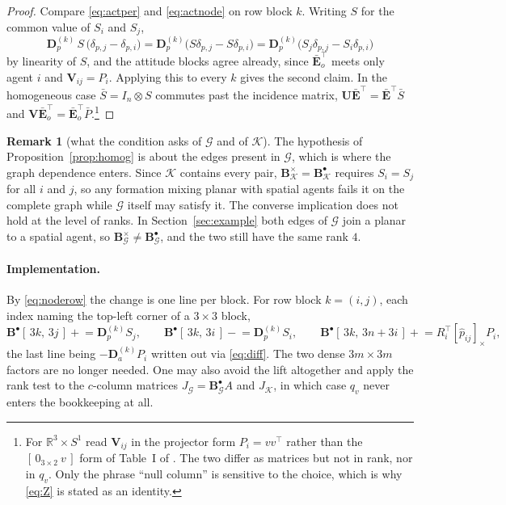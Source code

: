 \documentclass[11pt,a4paper]{article}
\theoremstyle{plain}
\theoremstyle{definition}
\newtheorem{remark}{Remark}
\newcommand{\R}{\mathbb{R}}
\newcommand{\Bper}{\mathbf{B}^{\times}}
\newcommand{\Bnode}{\mathbf{B}^{\bullet}}
\newcommand{\Ebar}{\bar{\mathbf{E}}}
\newcommand{\Ebaro}{\bar{\mathbf{E}}_o}
\newcommand{\Dp}{\mathbf{D}_p}
\newcommand{\Da}{\mathbf{D}_a}
\begin{document}
\begin{proof}
Compare \eqref{eq:actper} and \eqref{eq:actnode} on row block $k$. Writing $S$
for the common value of $S_i$ and $S_j$,
\begin{equation*}
  \Dp^{(k)}\,S\,\bigl(\delta_{p,j}-\delta_{p,i}\bigr)
  =\Dp^{(k)}\bigl(S\delta_{p,j}-S\delta_{p,i}\bigr)
  =\Dp^{(k)}\bigl(S_j\delta_{p,j}-S_i\delta_{p,i}\bigr)
\end{equation*}
by linearity of $S$, and the attitude blocks agree already, since
$\Ebaro^\top$ meets only agent $i$ and $\mathbf V_{ij}=P_i$. Applying this to
every $k$ gives the second claim. In the homogeneous case
$\bar S=I_n\otimes S$ commutes past the incidence matrix,
$\mathbf U\Ebar^\top=\Ebar^\top\bar S$ and
$\mathbf V\Ebaro^\top=\Ebaro^\top\bar P$.\footnote{For
$\R^3\times S^1$ read $\mathbf V_{ij}$ in the projector form $P_i=vv^\top$
rather than the $[\,0_{3\times2}\ v\,]$ form of Table~I of
\cite{michieletto2021}. The two differ as matrices but not in rank, nor in
$q_v$. Only the phrase ``null column'' is sensitive to the choice, which is why
\eqref{eq:Z} is stated as an identity.}
\end{proof}

\begin{remark}[what the condition asks of $\mathcal G$ and of $\mathcal K$]
The hypothesis of Proposition~\ref{prop:homog} is about the edges present in
$\mathcal G$, which is where the graph dependence enters. Since $\mathcal K$
contains every pair, $\Bper_{\mathcal K}=\Bnode_{\mathcal K}$ requires
$S_i=S_j$ for all $i$ and $j$, so any formation mixing planar with spatial
agents fails it on the complete graph while $\mathcal G$ itself may satisfy it.
The converse implication does not hold at the level of ranks. In
Section~\ref{sec:example} both edges of $\mathcal G$ join a planar to a spatial
agent, so $\Bper_{\mathcal G}\neq\Bnode_{\mathcal G}$, and the two still have
the same rank $4$.
\end{remark}

\paragraph{Implementation.}
By \eqref{eq:noderow} the change is one line per block. For row block
$k=(i,j)$, each index naming the top-left corner of a $3\times3$ block,
\begin{equation*}
  \Bnode[\,3k,\,3j\,]\mathrel{+}=\Dp^{(k)}S_j,
  \qquad
  \Bnode[\,3k,\,3i\,]\mathrel{-}=\Dp^{(k)}S_i,
  \qquad
  \Bnode[\,3k,\,3n{+}3i\,]\mathrel{+}=R_i^\top[\hat p_{ij}]_\times P_i ,
\end{equation*}
the last line being $-\Da^{(k)}P_i$ written out via \eqref{eq:diff}. The two
dense $3m\times3m$ factors are no longer needed. One may also avoid the lift
altogether and apply the rank test to the $c$-column matrices
$J_{\mathcal G}=\Bnode_{\mathcal G}A$ and $J_{\mathcal K}$, in which case
$q_v$ never enters the bookkeeping at all.
\end{document}
